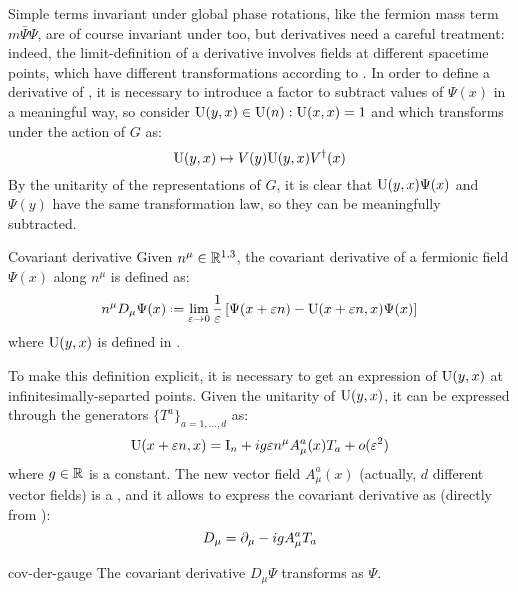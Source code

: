 Simple terms invariant under global phase rotations, like the fermion mass term $ m \bar{\Psi} \Psi $, are of course invariant under  too, but derivatives need a careful treatment: indeed, the limit-definition of a derivative involves fields at different spacetime points, which have different transformations according to . In order to define a derivative of \Psi, it is necessary to introduce a factor to subtract values of $ \Psi(x) $ in a meaningful way, so consider $ \mathrm{U}(y,x) \in \mathrm{U}(n) : \mathrm{U}(x,x) = 1 $ and which transforms under the action of $ G $ as:
\begin{equation}
  \mathrm{U}(y,x) \mapsto V(y) \mathrm{U}(y,x) V^\dagger(x)
  \label{eq:fac-cov-der}
\end{equation}
By the unitarity of the representations of $ G $, it is clear that $ \mathrm{U}(y,x) \Psi(x) $ and $ \Psi(y) $ have the same transformation law, so they can be meaningfully subtracted. 
\begin{definition}{Covariant derivative}{}
  Given $ n^\mu \in \mathbb{R}^{1,3} $, the covariant derivative of a fermionic field $ \Psi(x) $ along $ n^\mu $ is defined as:
  \begin{equation}
    n^\mu D_\mu \Psi(x) \defeq \lim_{\varepsilon \rightarrow 0} \frac{1}{\varepsilon} \left[ \Psi(x + \varepsilon n) - \tens{U}(x + \varepsilon n, x) \Psi(x) \right]
    \label{eq:cov-der-def}
  \end{equation}
  where $ \mathrm{U}(y,x) $ is defined in .
\end{definition}

To make this definition explicit, it is necessary to get an expression of $ \mathrm{U}(y,x) $ at infinitesimally-separted points. Given the unitarity of $ \mathrm{U}(y,x) $, it can be expressed through the generators $ \{T^a\}_{a = 1, \dots, d} $ as:
\begin{equation}
  \mathrm{U}(x + \varepsilon n, x) = \mathrm{I}_n + i g \varepsilon n^\mu A_\mu^a(x) T_a + o(\varepsilon^2)
  \label{eq:fac-cov-der-exp}
\end{equation}
where $ g \in \mathbb{R} $ is a constant. The new vector field $ A_\mu^a(x) $ (actually, $ d $ different vector fields) is a , and it allows to express the covariant derivative as (directly from ):
\begin{equation}
  D_\mu = \partial_\mu - i g A_\mu^a T_a
\end{equation}

\begin{proposition}{}{cov-der-gauge}
  The covariant derivative $ D_\mu \Psi $ transforms as $ \Psi $.
\end{proposition}

